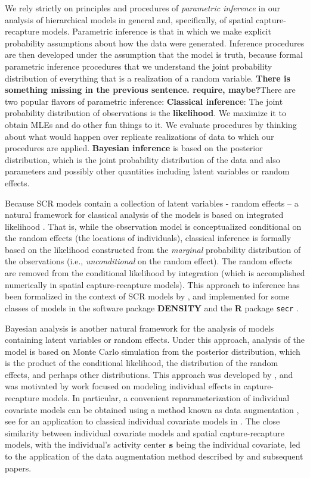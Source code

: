 We rely strictly on principles and procedures of {\it parametric
  inference} in our analysis of hierarchical models in general and,
specifically, of spatial capture-recapture models. Parametric
inference is that in which we make explicit probability assumptions
about how the data were generated. Inference procedures are then
developed under the assumption that the model is truth, because formal
parametric inference procedures that we understand the joint
probability distribution of everything that is a realization of a
random variable. {\bf There is something missing in the previous sentence. require, maybe?}There are two popular flavors of parametric
inference: {\bf Classical inference}: The joint probability distribution
of observations is the {\bf likelihood}. We maximize it to obtain MLEs
and do other fun things to it. We evaluate procedures by thinking
about what would happen over replicate realizations of data to which
our procedures are applied.  {\bf Bayesian inference} is based on the
posterior distribution, which is the joint probability distribution of
the data and also parameters and possibly other quantities including
latent variables or random effects.

Because SCR models contain a collection of latent variables - random
effects -- a natural framework for classical analysis of the models is
based on integrated likelihood \citep{laird_ware:1982,berger_etal:1999}. That is, while
the observation model is conceptualized conditional on the random
effects (the locations of individuals), classical inference is
formally based on the likelihood constructed from the {\it marginal}
probability distribution of the observations (i.e., {\it
  unconditional} on the random effect). The random effects are removed
from the conditional likelihood by integration (which is accomplished
numerically in spatial capture-recapture models). This approach to
inference has been formalized in the context of SCR models by
\citet{borchers_efford:2008, efford:2011}, and implemented for some
classes of models in the software package {\bf DENSITY} \citep{efford:2004}
and the {\bf R} package \mbox{\tt secr} \citep{efford:2011}.

Bayesian analysis is another natural framework for the analysis of
models containing latent variables or random effects.  Under this
approach, analysis of the model is based on Monte Carlo simulation
from the posterior distribution, which is the product of the
conditional likelihood, the distribution of the random effects, and
perhaps other distributions.  This approach was developed by
\citet{royle_young:2008}, and was motivated by work focused on
modeling individual effects in capture-recapture models. In
particular, a convenient reparameterization of individual covariate
models can be obtained using a method known as data augmentation
\citep{royle_etal:2007}, see \citet{royle:2008} for an application to
classical individual covariate models in \citet{royle:2008}. The close
similarity between individual covariate models and spatial
capture-recapture models, with the individual's activity center ${\bf
  s}$ being the individual covariate, led to the application of the
data augmentation method described by \citet{royle_young:2008} and subsequent papers.

